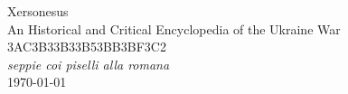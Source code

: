\documentclass[10pt,a4paper,twoside]{article} %
\begin{document}


\begin{titlepage}



  \centering %
    \vspace*{2cm} %
    {\Huge Xersonesus \\} %
    \vspace{1cm}
    {\Large An Historical and Critical Encyclopedia of the Ukraine War \\} %
    \vspace{2cm}
    {\Large 3AC3B33B33B53BB3BF3C2 \\} %
    {\normalsize \emph{ seppie coi piselli alla romana } \\}
    \vspace{1cm}
    {\today} %
    \vfill %


 \end{titlepage}
\end{document}
